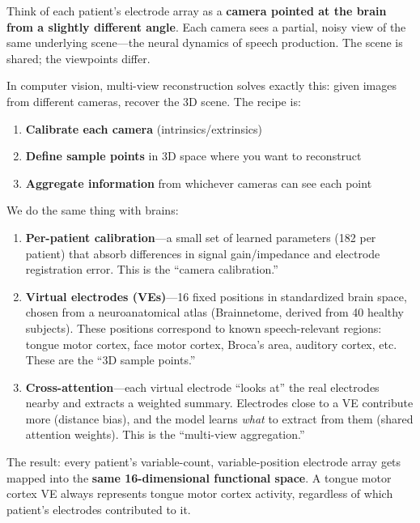 \documentclass[11pt,letterpaper]{article}
\begin{document}
Think of each patient's electrode array as a \textbf{camera pointed at the brain from a slightly different angle}. Each camera sees a partial, noisy view of the same underlying scene---the neural dynamics of speech production. The scene is shared; the viewpoints differ.

In computer vision, multi-view reconstruction solves exactly this: given images from different cameras, recover the 3D scene. The recipe is:

\begin{enumerate}[leftmargin=2em]
    \item \textbf{Calibrate each camera} (intrinsics/extrinsics)
    \item \textbf{Define sample points} in 3D space where you want to reconstruct
    \item \textbf{Aggregate information} from whichever cameras can see each point
\end{enumerate}

We do the same thing with brains:

\begin{enumerate}[leftmargin=2em]
    \item \textbf{Per-patient calibration}---a small set of learned parameters (182 per patient) that absorb differences in signal gain/impedance and electrode registration error. This is the ``camera calibration.''

    \item \textbf{Virtual electrodes (VEs)}---16 fixed positions in standardized brain space, chosen from a neuroanatomical atlas (Brainnetome, derived from 40 healthy subjects). These positions correspond to known speech-relevant regions: tongue motor cortex, face motor cortex, Broca's area, auditory cortex, etc. These are the ``3D sample points.''

    \item \textbf{Cross-attention}---each virtual electrode ``looks at'' the real electrodes nearby and extracts a weighted summary. Electrodes close to a VE contribute more (distance bias), and the model learns \textit{what} to extract from them (shared attention weights). This is the ``multi-view aggregation.''
\end{enumerate}

The result: every patient's variable-count, variable-position electrode array gets mapped into the \textbf{same 16-dimensional functional space}. A tongue motor cortex VE always represents tongue motor cortex activity, regardless of which patient's electrodes contributed to it.
\end{document}
